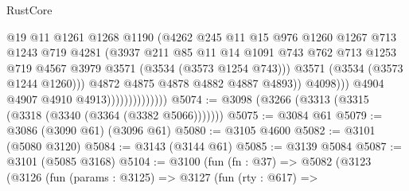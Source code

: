 \begin{lexlean}{RustCore}
\begin{coremodule}
                                          @19
                                          @11
                                          @1261
                                          @1268
                                          @1190
                                          (@4262
                                            @245
                                            @11
                                            @15
                                            @976
                                            @1260
                                            @1267
                                            @713
                                            @1243
                                            @719
                                            @4281
                                            (@3937
                                              @211
                                              @85
                                              @11
                                              @14
                                              @1091
                                              @743
                                              @762
                                              @713
                                              @1253
                                              @719
                                              @4567
                                              @3979
                                              @3571
                                              (@3534 (@3573 @1254 @743)))
                                            @3571
                                            (@3534 (@3573 @1244 @1260)))
                                          @4872
                                          @4875
                                          @4878
                                          @4882
                                          @4887
                                          @4893))
                                      @4098)))
                                @4904
                                @4907
                                @4910
                                @4913))))))))))))))
@5074 := @3098 (@3266 (@3313 (@3315 (@3318 (@3340 (@3364 (@3382 @5066)))))))
@5075 := @3084 @61
@5079 := @3086 (@3090 @61) (@3096 @61)
@5080 := @3105 @4600
@5082 := @3101 (@5080 @3120)
@5084 := @3143 (@3144 @61)
@5085 := @3139 @5084
@5087 := @3101 (@5085 @3168)
@5104 := @3100
    (fun (fn : @37) =>
    @5082
      (@3123
        (@3126
          (fun (params : @3125) =>
          @3127
            (fun (rty : @617) =>

\end{coremodule}
\end{lexlean}
